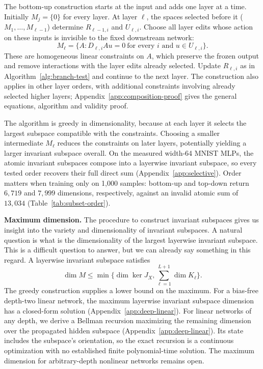\documentclass[twoside]{article}
\theoremstyle{remark}
\theoremstyle{highlightdefinition}
\theoremstyle{remark}
\begin{document}
The bottom-up construction starts at the input and adds one layer at a time. Initially $M_j=\{0\}$ for every layer. At layer $\ell$, the spaces selected before it ($M_1, \dots, M_{\ell-1}$) determine $R_{\ell-1,i}$ and $U_{\ell,i}$.
Choose all layer edits whose action on these inputs is invisible to the fixed downstream network:
\begin{equation}
 M_\ell=\{A:D_{\ell,i}Au=0\ \text{for every }i\text{ and }u\in U_{\ell,i}\}.
 \label{eq:bottom-up-constraints}
\end{equation}
These are homogeneous linear constraints on $A$, which preserve the frozen output and remove interactions with the layer edits already selected. Update $R_{\ell,i}$ as in Algorithm~\ref{alg:branch-test} and continue to the next layer. The construction also applies in other layer orders, with additional constraints involving already selected higher layers; Appendix~\ref{app:composition-proof} gives the general equations, algorithm and validity proof.

The algorithm is greedy in dimensionality, because at each layer it selects the largest subspace compatible with the constraints. Choosing a smaller intermediate $M_\ell$ reduces the constraints on later layers, potentially yielding a larger invariant subspace overall.
On the measured width-64 MNIST MLPs, the atomic invariant subspaces compose into a layerwise invariant subspace, so every tested order recovers their full direct sum (Appendix~\ref{app:selective}). Order matters when training only on 1,000 samples: bottom-up and top-down return $6{,}719$ and $7{,}999$ dimensions, respectively, against an invalid atomic sum of $13{,}034$ (Table~\ref{tab:subset-order}).


\textbf{Maximum dimension.} 
The procedure to construct invariant subspaces gives us insight into the variety and dimensionality of invariant subspaces. A natural question is what is the dimensionality of the largest layerwise invariant subspace. This is a difficult question to answer, but we can already say something in this regard.
A layerwise invariant subspace satisfies
\[
 \dim M\le\min\{\dim\ker J_X,\sum_{\ell=1}^{L+1}\dim K_\ell\}.
\]
The greedy construction supplies a lower bound on the maximum. 
For a bias-free depth-two linear network,  the maximum layerwise invariant subspace dimension has a closed-form solution (Appendix~\ref{app:deep-linear}). For linear networks of any depth, we derive a Bellman recursion maximizing the remaining dimension over the propagated hidden subspace (Appendix~\ref{app:deep-linear}). Its state includes the subspace's orientation, so the exact recursion is a continuous optimization with no established finite polynomial-time solution. The maximum dimension for arbitrary-depth nonlinear networks remains open.
\end{document}
